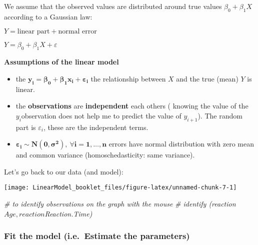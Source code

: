 \documentclass[
]{article}
\newenvironment{Shaded}{\begin{snugshade}}{\end{snugshade}}
\newcommand{\CommentTok}[1]{\textcolor[rgb]{0.56,0.35,0.01}{\textit{#1}}}
\newcommand{\DataTypeTok}[1]{\textcolor[rgb]{0.13,0.29,0.53}{#1}}
\newcommand{\DecValTok}[1]{\textcolor[rgb]{0.00,0.00,0.81}{#1}}
\newcommand{\KeywordTok}[1]{\textcolor[rgb]{0.13,0.29,0.53}{\textbf{#1}}}
\newcommand{\NormalTok}[1]{#1}
\newcommand{\OperatorTok}[1]{\textcolor[rgb]{0.81,0.36,0.00}{\textbf{#1}}}
\providecommand{\tightlist}{%
  \setlength{\itemsep}{0pt}\setlength{\parskip}{0pt}}
\begin{document}
We assume that the observed values are distributed around true values
\(\beta_0 + \beta_1 X\) according to a Gaussian law:

\(Y=\textrm{linear part} + \textrm{normal error}\)

\(Y=\beta_0 + \beta_1 X + \varepsilon\)

\textbf{Assumptions of the linear model}

\begin{itemize}
\tightlist
\item
  the \(\boldsymbol{y_i=\beta_0 + \beta_1 x_i + \varepsilon_i}\) the
  relationship between \(X\) and the true (mean) \(Y\) is linear.
\item
  the \textbf{observations} are \textbf{independent} each others (
  knowing the value of the \(y_i\)observation does not help me to
  predict the value of \(y_{i + 1}\)). The random part is
  \(\varepsilon_i\), these are the independent terms.
\item
  \(\boldsymbol{\varepsilon_i \sim N (0, \sigma ^ 2), \ \forall i=1, \ldots, n}\)
  errors have normal distribution with zero mean and common variance
  (homoschedasticity: same variance).
\end{itemize}

Let's go back to our data (and model):

\begin{Shaded}
\end{Shaded}

\begin{center}\texttt{[image: LinearModel\_booklet\_files/figure-latex/unnamed-chunk-7-1]} \end{center}

\begin{Shaded}
\begin{Highlighting}[]
\CommentTok{# to identify observations on the graph with the mouse}
\CommentTok{# identify (reaction$Age, reaction$Reaction.Time)}
\end{Highlighting}
\end{Shaded}

\hypertarget{fit-the-model-i.e.-estimate-the-parameters}{%
\subsubsection{Fit the model (i.e.~Estimate the
parameters)}\label{fit-the-model-i.e.-estimate-the-parameters}}
\end{document}
